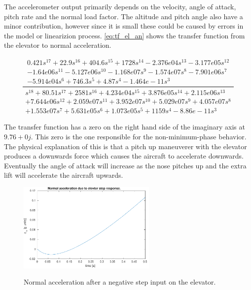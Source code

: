 The accelerometer output primarily depends on the velocity, angle of attack, pitch rate and the normal load factor. The altitude and pitch angle also have a minor contribution, however since it is small these could be caused by errors in the model or linearizion process. \autoref{eq:tf_el_an} shows the transfer function from the elevator to normal acceleration.

\begin{equation}
    \label{eq:tf_el_an}
    \frac{
    \begin{matrix}
        0.421 s^{17} + 22.9 s^{16} + 404.6 s^{15} + 1728 s^{14} - 2.376e04 s^{13} - 3.177e05 s^{12} \\
        - 1.64e06 s^{11} - 5.127e06 s^{10} - 1.168e07 s^{9} - 1.574e07 s^{8} - 7.901e06 s^{7} \\
        - 5.914e04 s^{6} +  746.3 s^{5} + 4.87 s^{4} - 1.464e-11 s^{3}
    \end{matrix}
    }{
    \begin{matrix}
        s^{18} + 80.51 s^{17} + 2581 s^{16} + 4.234e04 s^{15} + 3.876e05 s^{14} + 2.115e06 s^{13} \\
        + 7.644e06 s^{12} + 2.059e07 s^{11} + 3.952e07 s^{10} + 5.029e07 s^{9} + 4.057e07 s^{8} \\
        + 1.553e07 s^{7} + 5.631e05 s^{6} + 1.073e05 s^{5} + 1159 s^{4} - 8.86e-11 s^{3}
    \end{matrix}
    }
\end{equation}

The transfer function has a zero on the right hand side of the imaginary axis at $9.76+0j$. This zero is the one responsible for the non-minimum-phase behavior. The physical explanation of this is that a pitch up maneuverer with the elevator produces a downwards force which causes the aircraft to accelerate downwards. Eventually the angle of attack will increase as the nose pitches up and the extra lift will accelerate the aircraft upwards.

\begin{figure}[ht]
    \centering
    \includegraphics[width=0.6\textwidth]{figures/an_elev_step}
    \label{fig:an_elev_step}
    \caption{Normal acceleration after a negative step input on the elevator.}
\end{figure}

